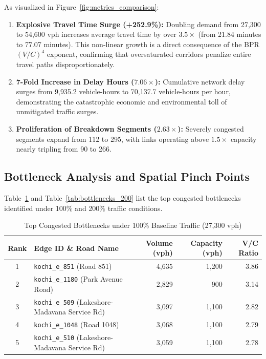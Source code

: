 \documentclass[12pt,a4paper]{report}
\begin{document}
As visualized in Figure~\ref{fig:metrics_comparison}:
\begin{enumerate}
  \item \textbf{Explosive Travel Time Surge (+252.9\%):} Doubling demand from 27,300 to 54,600 vph increases average travel time by over $3.5\times$ (from 21.84 minutes to 77.07 minutes). This non-linear growth is a direct consequence of the BPR $(V/C)^4$ exponent, confirming that oversaturated corridors penalize entire travel paths disproportionately.
  \item \textbf{7-Fold Increase in Delay Hours ($7.06\times$):} Cumulative network delay surges from 9,935.2 vehicle-hours to 70,137.7 vehicle-hours per hour, demonstrating the catastrophic economic and environmental toll of unmitigated traffic surges.
  \item \textbf{Proliferation of Breakdown Segments ($2.63\times$):} Severely congested segments expand from 112 to 295, with links operating above $1.5\times$ capacity nearly tripling from 90 to 266.
\end{enumerate}

\subsection*{Bottleneck Analysis and Spatial Pinch Points}
Table~\ref{tab:bottlenecks_100} and Table~\ref{tab:bottlenecks_200} list the top congested bottlenecks identified under 100\% and 200\% traffic conditions.

\begin{table}[H]
\centering
\caption{Top Congested Bottlenecks under 100\% Baseline Traffic (27,300 vph)}
\label{tab:bottlenecks_100}
\vspace{0.15cm}
\footnotesize
\setlength{\tabcolsep}{4pt}
\begin{tabularx}{\textwidth}{cXrrr}
\toprule
\textbf{Rank} & \textbf{Edge ID \& Road Name} & \textbf{Volume (vph)} & \textbf{Capacity (vph)} & \textbf{V/C Ratio} \\
\midrule
1 & \texttt{kochi\_e\_851} (Road 851) & 4,635 & 1,200 & 3.86 \\
2 & \texttt{kochi\_e\_1180} (Park Avenue Road) & 2,829 & 900 & 3.14 \\
3 & \texttt{kochi\_e\_509} (Lakeshore-Madavana Service Rd) & 3,097 & 1,100 & 2.82 \\
4 & \texttt{kochi\_e\_1048} (Road 1048) & 3,068 & 1,100 & 2.79 \\
5 & \texttt{kochi\_e\_510} (Lakeshore-Madavana Service Rd) & 3,059 & 1,100 & 2.78 \\
\bottomrule
\end{tabularx}
\end{table}
\end{document}
